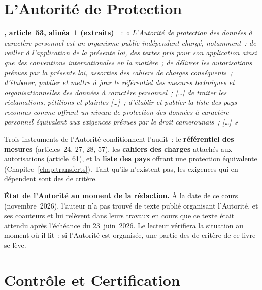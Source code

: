 \section{L'Autorité de Protection}
\label{sec:c06-autorite}

\begin{boxjuris}
\textbf{, article~53, alinéa~1 (extraits)}~\cite{loi2024017}~:
\textit{« L'Autorité de protection des données à caractère personnel est un
organisme public indépendant chargé, notamment~: de veiller à l'application
de la présente loi, des textes pris pour son application ainsi que des
conventions internationales en la matière~; de délivrer les autorisations
prévues par la présente loi, assorties des cahiers de charges
conséquents~; d'élaborer, publier et mettre à jour le référentiel des
mesures techniques et organisationnelles des données à caractère
personnel~; [\ldots] de traiter les réclamations, pétitions et plaintes
[\ldots]~; d'établir et publier la liste des pays reconnus comme offrant un
niveau de protection des données à caractère personnel équivalent aux
exigences prévues par le droit camerounais~; [\ldots] »}
\end{boxjuris}

Trois instruments de l'Autorité conditionnent l'audit~: le
\textbf{référentiel des mesures} (articles~24, 27, 28, 57), les
\textbf{cahiers des charges} attachés aux autorisations (article~61), et la
\textbf{liste des pays} offrant une protection équivalente
(Chapitre~\ref{chap:transferts}). Tant qu'ils n'existent pas, les exigences
qui en dépendent sont des \NEK{} de critère.

\begin{boxinfo}
\textbf{État de l'Autorité au moment de la rédaction.} À la date de ce cours
(novembre~2026), l'auteur n'a pas trouvé de texte publié organisant
l'Autorité, et ses coauteurs et lui relèvent dans leurs travaux en cours que
ce texte était attendu après l'échéance du 23~juin~2026. Le lecteur
vérifiera la situation au moment où il lit~: si l'Autorité est organisée,
une partie des \NEK{} de critère de ce livre se lève.
\end{boxinfo}

\section{Contrôle et Certification}
\label{sec:c06-certification}

